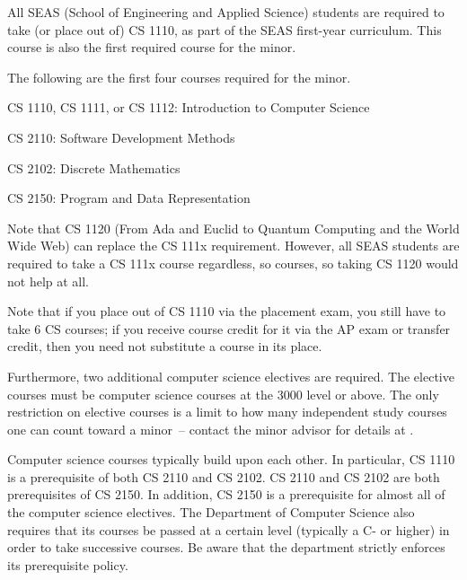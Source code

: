 
All SEAS (School of Engineering and Applied Science) students are
required to take (or place out of) CS 1110, as part of the SEAS
first-year curriculum. This course is also the first required course
for the minor.

The following are the first four courses required for the minor.

\begin{itemlist} 
\item CS 1110, CS 1111, or CS 1112: Introduction
  to Computer Science
\item CS 2110: Software Development Methods
\item CS 2102: Discrete Mathematics
\item CS 2150: Program and Data Representation
\end{itemlist}

Note that CS 1120 (From Ada and Euclid to Quantum Computing and the
World Wide Web) can replace the CS 111x requirement.  However, all
SEAS students are required to take a CS 111x course regardless, so
courses, so taking CS 1120 would not help at all.

Note that if you place out of CS 1110 via the placement exam,
you still have to take 6 CS courses; if you receive course credit for
it via the AP exam or transfer credit, then you need not substitute a
course in its place.

Furthermore, two additional computer science electives are
required. The elective courses must be computer science courses at the
3000 level or above. The only restriction on elective courses is a
limit to how many independent study courses one can count toward a
minor~-- contact the minor advisor for details at
\csminoradvisoremail.

Computer science courses typically build upon each other. In
particular, CS 1110 is a prerequisite of both CS 2110 and
CS 2102. CS 2110 and CS 2102 are both prerequisites
of CS 2150. In addition, CS 2150 is a prerequisite for
almost all of the computer science electives. The Department of
Computer Science also requires that its courses be passed at a certain
level (typically a C- or higher) in order to take successive
courses. Be aware that the department strictly enforces its
prerequisite policy.

